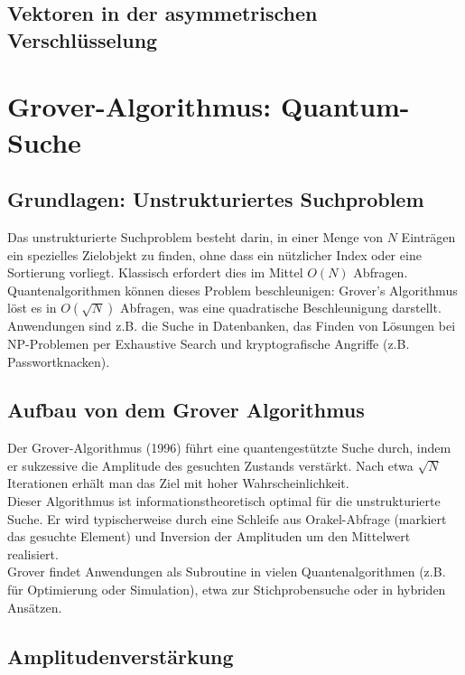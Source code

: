\subsection{Vektoren in der asymmetrischen Verschlüsselung}

\section{Grover-Algorithmus: Quantum-Suche}
\subsection{Grundlagen: Unstrukturiertes Suchproblem}

Das unstrukturierte Suchproblem besteht darin, in einer Menge von $N$ Einträgen ein spezielles Zielobjekt zu finden, ohne dass ein nützlicher Index oder eine Sortierung vorliegt. Klassisch erfordert dies im Mittel $O(N)$ Abfragen.\\
Quantenalgorithmen können dieses Problem beschleunigen: Grover’s Algorithmus löst es in $O(\sqrt{N})$ Abfragen, was eine quadratische Beschleunigung darstellt.\\
Anwendungen sind z.B. die Suche in Datenbanken, das Finden von Lösungen bei NP-Problemen per Exhaustive Search und kryptografische Angriffe (z.B. Passwortknacken).

\subsection{Aufbau von dem Grover Algorithmus}

Der Grover-Algorithmus (1996) führt eine quantengestützte Suche durch, indem er sukzessive die Amplitude des gesuchten Zustands verstärkt. Nach etwa $\sqrt{N}$ Iterationen erhält man das Ziel mit hoher Wahrscheinlichkeit.\\
Dieser Algorithmus ist informationstheoretisch optimal für die unstrukturierte Suche. Er wird typischerweise durch eine Schleife aus Orakel-Abfrage (markiert das gesuchte Element) und Inversion der Amplituden um den Mittelwert realisiert.\\
Grover findet Anwendungen als Subroutine in vielen Quantenalgorithmen (z.B. für Optimierung oder Simulation), etwa zur Stichprobensuche oder in hybriden Ansätzen.

\subsection{Amplitudenverstärkung}

